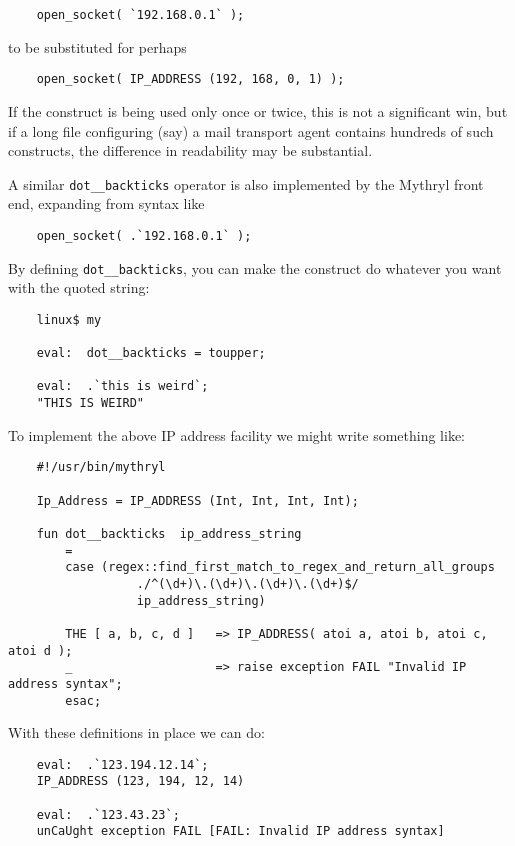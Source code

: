 \begin{verbatim}
    open_socket( `192.168.0.1` );
\end{verbatim}

to be substituted for perhaps

\begin{verbatim}
    open_socket( IP_ADDRESS (192, 168, 0, 1) );
\end{verbatim}

If the construct is being used only once or twice, this is not a 
significant win, but if a long file configuring (say) a 
mail transport agent contains hundreds of such constructs, the 
difference in readability may be substantial.

A similar {\tt dot\_\_backticks} operator is also implemented by 
the Mythryl front end, expanding from syntax like

\begin{verbatim}
    open_socket( .`192.168.0.1` );
\end{verbatim}

By defining {\tt dot\_\_backticks}, you can make the construct 
do whatever you want with the quoted string:

\begin{verbatim}
    linux$ my

    eval:  dot__backticks = toupper;

    eval:  .`this is weird`;
    "THIS IS WEIRD"
\end{verbatim}

To implement the above IP address facility we might write something like:

\begin{verbatim}
    #!/usr/bin/mythryl

    Ip_Address = IP_ADDRESS (Int, Int, Int, Int);

    fun dot__backticks  ip_address_string
        =
        case (regex::find_first_match_to_regex_and_return_all_groups
                  ./^(\d+)\.(\d+)\.(\d+)\.(\d+)$/
                  ip_address_string)

        THE [ a, b, c, d ]   => IP_ADDRESS( atoi a, atoi b, atoi c, atoi d );
        _                    => raise exception FAIL "Invalid IP address syntax";
        esac;
\end{verbatim}

With these definitions in place we can do:

\begin{verbatim}
    eval:  .`123.194.12.14`;
    IP_ADDRESS (123, 194, 12, 14)

    eval:  .`123.43.23`;
    unCaUght exception FAIL [FAIL: Invalid IP address syntax]
\end{verbatim}

